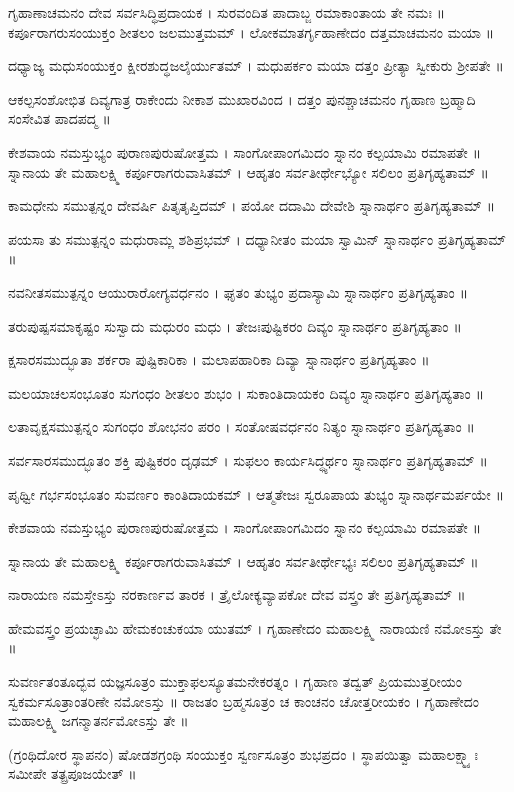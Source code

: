 ಗೃಹಾಣಾಚಮನಂ ದೇವ ಸರ್ವಸಿದ್ಧಿಪ್ರದಾಯಕ । ಸುರವಂದಿತ ಪಾದಾಬ್ಜ ರಮಾಕಾಂತಾಯ ತೇ ನಮಃ ॥
ಕರ್ಪೂರಾಗರುಸಂಯುಕ್ತಂ ಶೀತಲಂ ಜಲಮುತ್ತಮಮ್ । ಲೋಕಮಾತರ್ಗೃಹಾಣೇದಂ ದತ್ತಮಾಚಮನಂ ಮಯಾ ॥

ದಧ್ಯಾಜ್ಯ ಮಧುಸಂಯುಕ್ತಂ ಕ್ಷೀರಶುದ್ಧಜಲೈರ್ಯುತಮ್ । ಮಧುಪರ್ಕಂ ಮಯಾ ದತ್ತಂ ಪ್ರೀತ್ಯಾ ಸ್ವೀಕುರು ಶ್ರೀಪತೇ ॥

ಆಕಲ್ಪಸಂಶೋಭಿತ ದಿವ್ಯಗಾತ್ರ ರಾಕೇಂದು ನೀಕಾಶ ಮುಖಾರವಿಂದ । ದತ್ತಂ ಪುನಶ್ಚಾಚಮನಂ ಗೃಹಾಣ ಬ್ರಹ್ಮಾದಿ ಸಂಸೇವಿತ ಪಾದಪದ್ಮ ॥

ಕೇಶವಾಯ ನಮಸ್ತುಭ್ಯಂ ಪುರಾಣಪುರುಷೋತ್ತಮ । ಸಾಂಗೋಪಾಂಗಮಿದಂ ಸ್ನಾನಂ ಕಲ್ಪಯಾಮಿ ರಮಾಪತೇ ॥
ಸ್ನಾನಾಯ ತೇ ಮಹಾಲಕ್ಷ್ಮಿ ಕರ್ಪೂರಾಗರುವಾಸಿತಮ್ । ಆಹೃತಂ ಸರ್ವತೀರ್ಥೇಭ್ಯೋ ಸಲಿಲಂ ಪ್ರತಿಗೃಹ್ಯತಾಮ್ ॥

ಕಾಮಧೇನು ಸಮುತ್ಪನ್ನಂ ದೇವರ್ಷಿ ಪಿತೃತೃಪ್ತಿದಮ್ । ಪಯೋ ದದಾಮಿ ದೇವೇಶಿ ಸ್ನಾನಾರ್ಥಂ ಪ್ರತಿಗೃಹ್ಯತಾಮ್ ॥

ಪಯಸಾ ತು ಸಮುತ್ಪನ್ನಂ ಮಧುರಾಮ್ಲ ಶಶಿಪ್ರಭಮ್ । ದಧ್ಯಾನೀತಂ ಮಯಾ ಸ್ವಾಮಿನ್ ಸ್ನಾನಾರ್ಥಂ ಪ್ರತಿಗೃಹ್ಯತಾಮ್ ॥

ನವನೀತಸಮುತ್ಪನ್ನಂ ಆಯುರಾರೋಗ್ಯವರ್ಧನಂ । ಘೃತಂ ತುಭ್ಯಂ ಪ್ರದಾಸ್ಯಾಮಿ ಸ್ನಾನಾರ್ಥಂ ಪ್ರತಿಗೃಹ್ಯತಾಂ ॥

ತರುಪುಷ್ಪಸಮಾಕೃಷ್ಟಂ ಸುಸ್ವಾದು ಮಧುರಂ ಮಧು । ತೇಜಃಪುಷ್ಟಿಕರಂ ದಿವ್ಯಂ ಸ್ನಾನಾರ್ಥಂ ಪ್ರತಿಗೃಹ್ಯತಾಂ ॥

ಕ್ಷಸಾರಸಮುದ್ಭೂತಾ ಶರ್ಕರಾ ಪುಷ್ಟಿಕಾರಿಕಾ । ಮಲಾಪಹಾರಿಕಾ ದಿವ್ಯಾ ಸ್ನಾನಾರ್ಥಂ ಪ್ರತಿಗೃಹ್ಯತಾಂ ॥

ಮಲಯಾಚಲಸಂಭೂತಂ ಸುಗಂಧಂ ಶೀತಲಂ ಶುಭಂ । ಸುಕಾಂತಿದಾಯಕಂ ದಿವ್ಯಂ ಸ್ನಾನಾರ್ಥಂ ಪ್ರತಿಗೃಹ್ಯತಾಂ ॥

ಲತಾವೃಕ್ಷಸಮುತ್ಪನ್ನಂ ಸುಗಂಧಂ ಶೋಭನಂ ಪರಂ । ಸಂತೋಷವರ್ಧನಂ ನಿತ್ಯಂ ಸ್ನಾನಾರ್ಥಂ ಪ್ರತಿಗೃಹ್ಯತಾಂ ॥

ಸರ್ವಸಾರಸಮುದ್ಭೂತಂ ಶಕ್ತಿ ಪುಷ್ಟಿಕರಂ ದೃಢಮ್ । ಸುಫಲಂ ಕಾರ್ಯಸಿದ್ಧ್ಯರ್ಥಂ ಸ್ನಾನಾರ್ಥಂ ಪ್ರತಿಗೃಹ್ಯತಾಮ್ ॥

ಪೃಥ್ವೀ ಗರ್ಭಸಂಭೂತಂ ಸುವರ್ಣಂ ಕಾಂತಿದಾಯಕಮ್ । ಆತ್ಮತೇಜಃ ಸ್ವರೂಪಾಯ ತುಭ್ಯಂ ಸ್ನಾನಾರ್ಥಮರ್ಪಯೇ ॥

ಕೇಶವಾಯ ನಮಸ್ತುಭ್ಯಂ ಪುರಾಣಪುರುಷೋತ್ತಮ । ಸಾಂಗೋಪಾಂಗಮಿದಂ ಸ್ನಾನಂ ಕಲ್ಪಯಾಮಿ ರಮಾಪತೇ ॥

ಸ್ನಾನಾಯ ತೇ ಮಹಾಲಕ್ಷ್ಮಿ ಕರ್ಪೂರಾಗರುವಾಸಿತಮ್ । ಆಹೃತಂ ಸರ್ವತೀರ್ಥೇಭ್ಯಃ ಸಲಿಲಂ ಪ್ರತಿಗೃಹ್ಯತಾಮ್ ॥

ನಾರಾಯಣ ನಮಸ್ತೇಽಸ್ತು ನರಕಾರ್ಣವ ತಾರಕ । ತ್ರೈಲೋಕ್ಯವ್ಯಾಪಕೋ ದೇವ ವಸ್ತ್ರಂ ತೇ ಪ್ರತಿಗೃಹ್ಯತಾಮ್ ॥

ಹೇಮವಸ್ತ್ರಂ ಪ್ರಯಚ್ಛಾಮಿ ಹೇಮಕಂಚುಕಯಾ ಯುತಮ್ । ಗೃಹಾಣೇದಂ ಮಹಾಲಕ್ಷ್ಮಿ ನಾರಾಯಣಿ ನಮೋಽಸ್ತು ತೇ ॥

ಸುವರ್ಣತಂತೂದ್ಭವ ಯಜ್ಞಸೂತ್ರಂ ಮುಕ್ತಾಫಲಸ್ಯೂತಮನೇಕರತ್ನಂ । ಗೃಹಾಣ ತದ್ವತ್ ಪ್ರಿಯಮುತ್ತರೀಯಂ ಸ್ವಕರ್ಮಸೂತ್ರಾಂತರಿಣೇ ನಮೋಽಸ್ತು ॥
ರಾಜತಂ ಬ್ರಹ್ಮಸೂತ್ರಂ ಚ ಕಾಂಚನಂ ಚೋತ್ತರೀಯಕಂ । ಗೃಹಾಣೇದಂ ಮಹಾಲಕ್ಷ್ಮಿ ಜಗನ್ಮಾತರ್ನಮೋಽಸ್ತು ತೇ ॥

(ಗ್ರಂಥಿದೋರ ಸ್ಥಾಪನಂ) ಷೋಡಶಗ್ರಂಥಿ ಸಂಯುಕ್ತಂ ಸ್ವರ್ಣಸೂತ್ರಂ ಶುಭಪ್ರದಂ । ಸ್ಥಾಪಯಿತ್ವಾ ಮಹಾಲಕ್ಷ್ಮ್ಯಾಃ ಸಮೀಪೇ ತತ್ಪ್ರಪೂಜಯೇತ್ ॥

